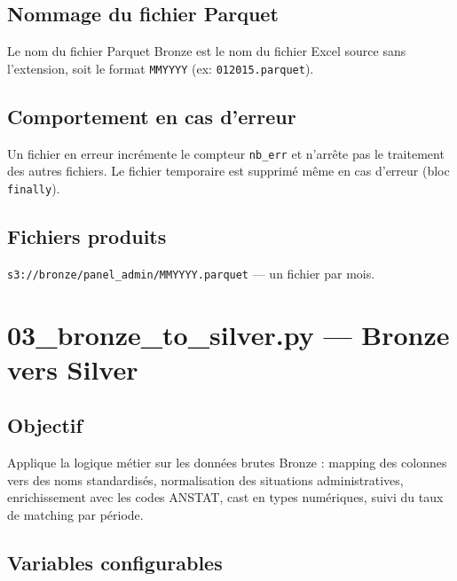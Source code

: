 \documentclass[12pt,a4paper,french]{report}
\newcommand{\bucket}[1]{\texttt{s3://#1}}
\begin{document}
\subsection{Nommage du fichier Parquet}

Le nom du fichier Parquet Bronze est le nom du fichier Excel source sans
l'extension, soit le format \texttt{MMYYYY} (ex: \texttt{012015.parquet}).

\subsection{Comportement en cas d'erreur}

Un fichier en erreur incrémente le compteur \texttt{nb\_err} et n'arrête
pas le traitement des autres fichiers. Le fichier temporaire est supprimé
même en cas d'erreur (bloc \texttt{finally}).

\subsection{Fichiers produits}

\bucket{bronze/panel\_admin/MMYYYY.parquet} — un fichier par mois.

\section{03\_bronze\_to\_silver.py — Bronze vers Silver}

\subsection{Objectif}

Applique la logique métier sur les données brutes Bronze : mapping des
colonnes vers des noms standardisés, normalisation des situations
administratives, enrichissement avec les codes ANSTAT, cast en types
numériques, suivi du taux de matching par période.

\subsection{Variables configurables}
\end{document}
